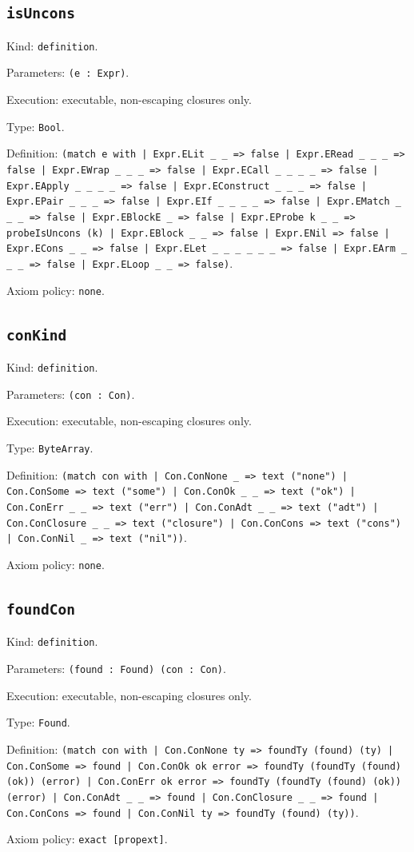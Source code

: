 \documentclass[11pt]{article}
\begin{document}
\subsection*{\texttt{isUncons}}
\noindent Kind: \texttt{definition}.\par
\noindent Parameters: \texttt{(e : Expr)}.\par
\noindent Execution: executable, non-escaping closures only.\par
\noindent Type: \texttt{Bool}.\par
\noindent Definition: \texttt{(match e with | Expr.ELit \_ \_ => false | Expr.ERead \_ \_ \_ => false | Expr.EWrap \_ \_ \_ => false | Expr.ECall \_ \_ \_ \_ => false | Expr.EApply \_ \_ \_ \_ => false | Expr.EConstruct \_ \_ \_ => false | Expr.EPair \_ \_ \_ => false | Expr.EIf \_ \_ \_ \_ => false | Expr.EMatch \_ \_ \_ => false | Expr.EBlockE \_ => false | Expr.EProbe k \_ \_ => probeIsUncons (k) | Expr.EBlock \_ \_ => false | Expr.ENil => false | Expr.ECons \_ \_ => false | Expr.ELet \_ \_ \_ \_ \_ \_ => false | Expr.EArm \_ \_ \_ => false | Expr.ELoop \_ \_ => false)}.\par
\noindent Axiom policy: \texttt{none}.\par
\subsection*{\texttt{conKind}}
\noindent Kind: \texttt{definition}.\par
\noindent Parameters: \texttt{(con : Con)}.\par
\noindent Execution: executable, non-escaping closures only.\par
\noindent Type: \texttt{ByteArray}.\par
\noindent Definition: \texttt{(match con with | Con.ConNone \_ => text ("none") | Con.ConSome => text ("some") | Con.ConOk \_ \_ => text ("ok") | Con.ConErr \_ \_ => text ("err") | Con.ConAdt \_ \_ => text ("adt") | Con.ConClosure \_ \_ => text ("closure") | Con.ConCons => text ("cons") | Con.ConNil \_ => text ("nil"))}.\par
\noindent Axiom policy: \texttt{none}.\par
\subsection*{\texttt{foundCon}}
\noindent Kind: \texttt{definition}.\par
\noindent Parameters: \texttt{(found : Found) (con : Con)}.\par
\noindent Execution: executable, non-escaping closures only.\par
\noindent Type: \texttt{Found}.\par
\noindent Definition: \texttt{(match con with | Con.ConNone ty => foundTy (found) (ty) | Con.ConSome => found | Con.ConOk ok error => foundTy (foundTy (found) (ok)) (error) | Con.ConErr ok error => foundTy (foundTy (found) (ok)) (error) | Con.ConAdt \_ \_ => found | Con.ConClosure \_ \_ => found | Con.ConCons => found | Con.ConNil ty => foundTy (found) (ty))}.\par
\noindent Axiom policy: \texttt{exact [propext]}.\par
\end{document}
